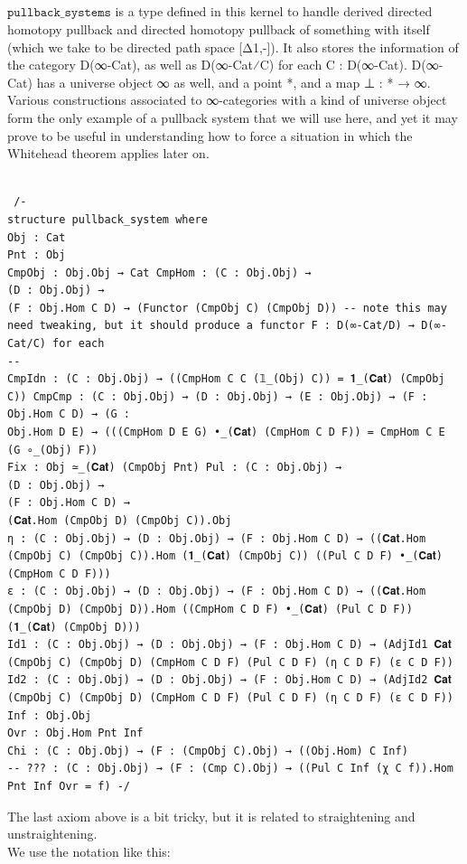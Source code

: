 \documentclass{book}
\theoremstyle{definition}
\newcounter{pcounter}
\newcounter{lcounter}
\newcounter{sectioncount}
\newcounter{subsectioncount}
\renewcommand{\section}[1]{\newpage\ \\ \ \\ \begin{center} \scalebox{1.5}{\texttt{\thesectioncount . #1}} \stepcounter{sectioncount} \setcounter{subsectioncount}{1} \end{center} \begin{center} \ \\ \ \\ \thispagestyle{empty} \end{center}}
\begin{document}
\section{$\texttt{pullback\_systems}$}
$\texttt{pullback\_systems}$ is a type defined in this kernel to handle derived directed homotopy pullback and directed homotopy pullback of something with itself (which we take to be directed path space [Δ1,-]). It also stores the information of the category D(∞-Cat), as well as D(∞-Cat⁄C) for each C : D(∞-Cat). D(∞-Cat) has a universe object ∞ as well, and a point *, and a map ⊥ : * → ∞. Various constructions associated to ∞-categories with a kind of universe object form the only example of a pullback system that we will use here, and yet it may prove to be useful in understanding how to force a situation in which the Whitehead theorem applies later on. \\
\begin{center} \begin{tcolorbox}[width=5in,colback={white},title={\begin{center}\texttt{Lean \thelcounter} \addtocounter{lcounter}{1} \end{center}},colbacktitle=Blue,coltitle=black] \begin{verbatim}

 /-
structure pullback_system where
Obj : Cat
Pnt : Obj
CmpObj : Obj.Obj → Cat CmpHom : (C : Obj.Obj) →
(D : Obj.Obj) →
(F : Obj.Hom C D) → (Functor (CmpObj C) (CmpObj D)) -- note this may need tweaking, but it should produce a functor F : D(∞-Cat/D) → D(∞-Cat/C) for each
--
CmpIdn : (C : Obj.Obj) → ((CmpHom C C (𝟙_(Obj) C)) = 𝟏_(𝐂𝐚𝐭) (CmpObj C)) CmpCmp : (C : Obj.Obj) → (D : Obj.Obj) → (E : Obj.Obj) → (F : Obj.Hom C D) → (G :
Obj.Hom D E) → (((CmpHom D E G) •_(𝐂𝐚𝐭) (CmpHom C D F)) = CmpHom C E (G ∘_(Obj) F))
Fix : Obj ≃_(𝐂𝐚𝐭) (CmpObj Pnt) Pul : (C : Obj.Obj) →
(D : Obj.Obj) →
(F : Obj.Hom C D) →
(𝐂𝐚𝐭.Hom (CmpObj D) (CmpObj C)).Obj
η : (C : Obj.Obj) → (D : Obj.Obj) → (F : Obj.Hom C D) → ((𝐂𝐚𝐭.Hom (CmpObj C) (CmpObj C)).Hom (𝟏_(𝐂𝐚𝐭) (CmpObj C)) ((Pul C D F) •_(𝐂𝐚𝐭) (CmpHom C D F)))
ε : (C : Obj.Obj) → (D : Obj.Obj) → (F : Obj.Hom C D) → ((𝐂𝐚𝐭.Hom (CmpObj D) (CmpObj D)).Hom ((CmpHom C D F) •_(𝐂𝐚𝐭) (Pul C D F)) (𝟏_(𝐂𝐚𝐭) (CmpObj D)))
Id1 : (C : Obj.Obj) → (D : Obj.Obj) → (F : Obj.Hom C D) → (AdjId1 𝐂𝐚𝐭 (CmpObj C) (CmpObj D) (CmpHom C D F) (Pul C D F) (η C D F) (ε C D F))
Id2 : (C : Obj.Obj) → (D : Obj.Obj) → (F : Obj.Hom C D) → (AdjId2 𝐂𝐚𝐭 (CmpObj C) (CmpObj D) (CmpHom C D F) (Pul C D F) (η C D F) (ε C D F))
Inf : Obj.Obj
Ovr : Obj.Hom Pnt Inf
Chi : (C : Obj.Obj) → (F : (CmpObj C).Obj) → ((Obj.Hom) C Inf)
-- ??? : (C : Obj.Obj) → (F : (Cmp C).Obj) → ((Pul C Inf (χ C f)).Hom Pnt Inf Ovr = f) -/
\end{verbatim} \end{tcolorbox} \end{center}
The last axiom above is a bit tricky, but it is related to straightening and unstraightening.\\ We use the notation like this:
\end{document}
